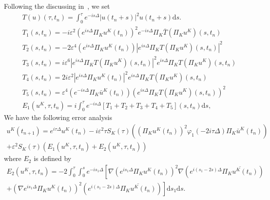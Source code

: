 \documentclass[10pt,a4paper]{article}
\begin{document}
  Following the discussing in~\cite{ORS21}, we set
  \begin{align}
    \label{TOp}& T(u)(\tau,t_n) = \int_0^{\tau} e^{-is\Delta} |u(t_n+s)|^2 u(t_n+s) \mathrm{d} s.\\
    \label{T1} & T_1(s, t_n) = -i\varepsilon^2 \left(e^{i s \Delta} \Pi_K u^K\left(t_n\right)\right)^2 e^{-i s \Delta} \Pi_K \bar{T}\left(\Pi_K u^K\right)\left(s, t_n\right) \\
    \label{T2} & T_2(s, t_n) = -2\varepsilon^4 \left(e^{i s \Delta} \Pi_K u^K\left(t_n\right)\right)\left|e^{i s \Delta} \Pi_K T\left(\Pi_K u^K\right)\left(s, t_n\right)\right|^2 \\
    \label{T3} & T_3(s, t_n) = i\varepsilon^6 \left|e^{i s \Delta} \Pi_K T\left(\Pi_K u^K\right)\left(s, t_n\right)\right|^2 e^{i s \Delta} \Pi_K T\left(\Pi_K u^K\right)\left(s, t_n\right) \\
    \label{T4} & T_4(s, t_n) = 2i\varepsilon^2 \left|e^{i s \Delta} \Pi_K u^K\left(t_n\right)\right|^2 e^{i s \Delta} \Pi_K T\left(\Pi_K u^K\right)\left(s, t_n\right) \\
    \label{T5} & T_5(s, t_n) = \varepsilon^4 \left(e^{-i s \Delta} \Pi_K \bar{u}^K\left(t_n\right)\right)\left(e^{i s \Delta} \Pi_K T\left(\Pi_K u^K\right)\left(s, t_n\right)\right)^2 \\
    \label{E1} & E_1(u^K, \tau, t_n) = i \int_0^{\tau} e^{-is\Delta} 
    [T_1 + T_2 + T_3 + T_4 + T_5](s, t_n) \mathrm{d} s,
  \end{align}
  We have the following error analysis
  \begin{multline}
    u^K(t_{n+1}) = e^{i\tau\Delta}u^K(t_n) 
    - i\varepsilon^2\tau S_K(\tau) \left( \left(\Pi_K u^K(t_n)\right)^2 
    \varphi_1(-2i\tau\Delta)\Pi_K \bar{u}^K(t_n) \right) \\
    + \varepsilon^2 S_K(\tau) \left( E_1(u^K, \tau, t_n) + E_2(u^K, \tau, t_n) 
    \right)
  \end{multline}
  where \(E_2\) is defined by 
  \begin{multline}\label{E2}
    E_2(u^K, \tau, t_n) = -2 \int_0^{\tau} \int_0^s e^{-is_1\Delta} \left[
    \nabla \left(e^{is_1\Delta}\Pi_K u^K(t_n)\right)^2 
    \nabla \left(e^{i(s_1-2s)\Delta}\overline{\Pi_K u^K(t_n)}\right)\right. \\
    \left.+ \left( \nabla e^{is_1\Delta}\Pi_K u^K(t_n) \right)^2 
    \left( e^{i(s_1-2s)\Delta}\overline{\Pi_K u^K(t_n)} \right) 
    \right] \mathrm{d}s_1\mathrm{d}s .
  \end{multline}
  
\end{document}
